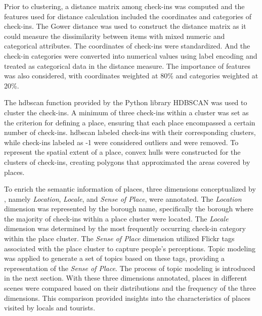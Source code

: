 \documentclass{article}
\theoremstyle{definition}
\theoremstyle{remark}
\begin{document}
Prior to clustering, a distance matrix among check-ins was computed and the features used for distance calculation included the coordinates and categories of check-ins. The Gower distance \citep{gower_general_1971} was used to construct the distance matrix as it could measure the dissimilarity between items with mixed numeric and categorical attributes. The coordinates of check-ins were standardized. And the check-in categories were converted into numerical values using label encoding and treated as categorical data in the distance measure. The importance of features was also considered, with coordinates weighted at 80\% and categories weighted at 20\%.

The hdbscan function provided by the Python library HDBSCAN \citep{mcinnes_hdbscan_2017} was used to cluster the check-ins. A minimum of three check-ins within a cluster was set as the criterion for defining a place, ensuring that each place encompassed a certain number of check-ins. \acrshort{hdbscan} labeled check-ins with their corresponding clusters, while check-ins labeled as -1 were considered outliers and were removed. To represent the spatial extent of a place, convex hulls were constructed for the clusters of check-ins, creating polygons that approximated the areas covered by places.

To enrich the semantic information of places, three dimensions conceptualized by \cite{agnew_space_2011}, namely \textit{Location}, \textit{Locale}, and \textit{Sense of Place}, were annotated. The \textit{Location} dimension was represented by the borough name, specifically the borough where the majority of check-ins within a place cluster were located. The \textit{Locale} dimension was determined by the most frequently occurring check-in category within the place cluster. The \textit{Sense of Place} dimension utilized Flickr tags associated with the place cluster to capture people's perceptions. Topic modeling was applied to generate a set of topics based on these tags, providing a representation of the \textit{Sense of Place}. The process of topic modeling is introduced in the next section. With these three dimensions annotated, places in different scenes were compared based on their distributions and the frequency of the three dimensions. This comparison provided insights into the characteristics of places visited by locals and tourists.

\end{document}
